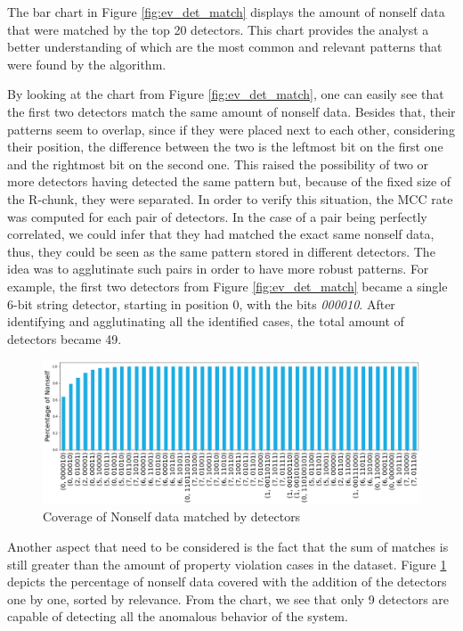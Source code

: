 The bar chart in Figure \ref{fig:ev_det_match} displays the amount of nonself data that were matched by the top 20 detectors. This chart provides the analyst a better understanding of which are the most common and relevant patterns that were found by the algorithm.

By looking at the chart from Figure \ref{fig:ev_det_match}, one can easily see that the first two detectors match the same amount of nonself data. Besides that, their patterns seem to overlap, since if they were placed next to each other, considering their position, the difference between the two is the leftmost bit on the first one and the rightmost bit on the second one. This raised the possibility of two or more detectors having detected the same pattern but, because of the fixed size of the R-chunk, they were separated. In order to verify this situation, the MCC rate was computed for each pair of detectors. In the case of a pair being perfectly correlated, we could infer that they had matched the exact same nonself data, thus, they could be seen as the same pattern stored in different detectors. The idea was to agglutinate such pairs in order to have more robust patterns. For example, the first two detectors from Figure \ref{fig:ev_det_match} became a single 6-bit string detector, starting in position 0, with the bits \textit{000010}. After identifying and agglutinating all the identified cases, the total amount of detectors became 49.

\begin{figure}[]
	\centering
	\includegraphics[width=\textwidth, keepaspectratio]{img/det_coverage.png}
	\caption{Coverage of Nonself data matched by detectors}
	\label{fig:ev_det_cov}
\end{figure}

Another aspect that need to be considered is the fact that the sum of matches is still greater than the amount of property violation cases in the dataset. Figure \ref{fig:ev_det_cov} depicts the percentage of nonself data covered with the addition of the detectors one by one, sorted by relevance. From the chart, we see that only 9 detectors are capable of detecting all the anomalous behavior of the system. 

